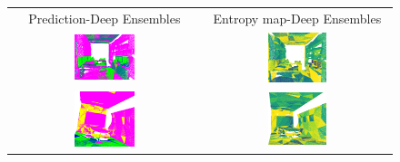     \begin{figure}[h!]
        \centering
        \begin{tabular}{cc}
            Prediction-Deep Ensembles & Entropy map-Deep Ensembles \\
            \includegraphics[width=0.33\textwidth, height=0.18\textheight]{images/seg_output/s3dis_DE/S3DIS_1_Pred.pdf}& 
            \includegraphics[width=0.33\textwidth, height=0.18\textheight]{images/seg_output/flipout/ent_de_s3dis_3.pdf}\\

            \includegraphics[width=0.33\textwidth, height=0.18\textheight]{images/seg_output/s3dis_DE/S3DIS_2_Pred.pdf}& 
            \includegraphics[width=0.33\textwidth, height=0.18\textheight]{images/seg_output/flipout/ent_de_s3dis_1.pdf}\\


\end{tabular}
\end{figure}

